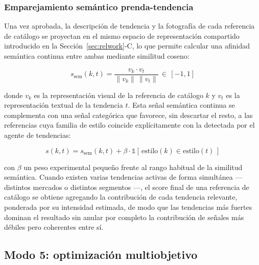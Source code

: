 \documentclass[conference]{IEEEtran}
\begin{document}
\subsubsection{Emparejamiento semántico prenda-tendencia}

Una vez aprobada, la descripción de tendencia y la fotografía de cada
referencia de catálogo se proyectan en el mismo espacio de representación
compartido introducido en la Sección~\ref{sec:relwork}-C, lo que permite
calcular una afinidad semántica continua entre ambas mediante similitud
coseno:

\begin{equation}
s_{\text{sem}}(k, t) = \frac{v_{k} \cdot v_{t}}{\lVert v_{k} \rVert \, \lVert v_{t} \rVert} \, \in \, [-1, 1]
\label{eq:sem}
\end{equation}

\noindent donde $v_k$ es la representación visual de la referencia de
catálogo $k$ y $v_t$ es la representación textual de la tendencia $t$. Esta
señal semántica continua se complementa con una señal categórica que
favorece, sin descartar el resto, a las referencias cuya familia de estilo
coincide explícitamente con la detectada por el agente de tendencias:

\begin{equation}
s(k, t) = s_{\text{sem}}(k, t) + \beta \cdot \mathbb{1}\!\left[\,\text{estilo}(k) \in \text{estilo}(t)\,\right]
\label{eq:score}
\end{equation}

\noindent con $\beta$ un peso experimental pequeño frente al rango habitual
de la similitud semántica. Cuando existen varias tendencias activas de forma
simultánea --- distintos mercados o distintos segmentos ---, el score final
de una referencia de catálogo se obtiene agregando la contribución de cada
tendencia relevante, ponderada por su intensidad estimada, de modo que las
tendencias más fuertes dominan el resultado sin anular por completo la
contribución de señales más débiles pero coherentes entre sí.


\subsection{Modo 5: optimización multiobjetivo}
\label{sec:mode5}
\end{document}

